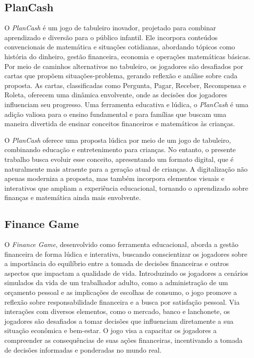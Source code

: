 \subsection{PlanCash}
O \textit{PlanCash}\cite{mariano2020educaccao} é um jogo de tabuleiro inovador, projetado para combinar aprendizado e diversão para o público infantil. Ele incorpora conteúdos convencionais de matemática e situações cotidianas, abordando tópicos como história do dinheiro, gestão financeira, economia e operações matemáticas básicas. Por meio de caminhos alternativos no tabuleiro, os jogadores são desafiados por cartas que propõem situações-problema, gerando reflexão e análise sobre cada proposta. As cartas, classificadas como Pergunta, Pagar, Receber, Recompensa e Roleta, oferecem uma dinâmica envolvente, onde as decisões dos jogadores influenciam seu progresso. Uma ferramenta educativa e lúdica, o \textit{PlanCash}\cite{mariano2020educaccao} é uma adição valiosa para o ensino fundamental e para famílias que buscam uma maneira divertida de ensinar conceitos financeiros e matemáticos às crianças.

O \textit{PlanCash}\cite{mariano2020educaccao} oferece uma proposta lúdica por meio de um jogo de tabuleiro, combinando educação e entretenimento para crianças. No  entanto, o presente trabalho busca evoluir esse conceito, apresentando um formato digital, que é naturalmente mais atraente para a geração atual de crianças. A digitalização não apenas moderniza a proposta, mas também incorpora elementos visuais e interativos que ampliam a experiência educacional, tornando o aprendizado sobre finanças e matemática ainda mais envolvente.

\subsection{Finance Game}
O \textit{Finance Game}\cite{Finance_Game}, desenvolvido como ferramenta educacional, aborda a gestão financeira de forma lúdica e interativa, buscando conscientizar os jogadores sobre a importância do equilíbrio entre a tomada de decisões financeiras e outros aspectos que impactam a qualidade de vida. Introduzindo os jogadores a cenários simulados da vida de um trabalhador adulto, como a administração de um orçamento pessoal e as implicações de escolhas de consumo, o jogo promove a reflexão sobre responsabilidade financeira e a busca por satisfação pessoal. Via interações com diversos elementos, como o mercado, banco e lanchonete, os jogadores são desafiados a tomar decisões que influenciam diretamente a sua situação econômica e bem-estar. O jogo visa a capacitar os jogadores a compreender as consequências de suas ações financeiras, incentivando a tomada de decisões informadas e ponderadas no mundo real.

